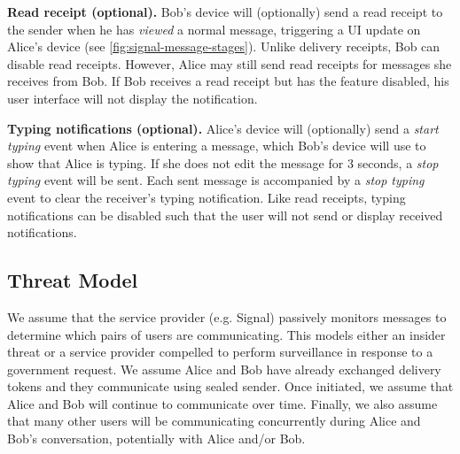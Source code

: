 \medskip \noindent
\textbf{Read receipt (optional).} 
Bob's device will (optionally) send a read receipt to the sender when he has \emph{viewed} a normal
message, triggering a UI update on Alice's device 
(see \cref{fig:signal-message-stages}). Unlike delivery receipts, Bob can disable read receipts. However, Alice may still send read receipts for messages she receives
from Bob. If Bob receives a read receipt but has the feature disabled, his user
interface will not display the notification. %

\medskip \noindent
\textbf{Typing notifications (optional).}\label{sssec:signal-typingNotifications}
Alice's device will (optionally) send a \emph{start typing} event when Alice is entering a
message, which Bob's device will use to show that Alice is typing. If she does
not edit the message for 3 seconds, a \emph{stop typing} event will be sent.
Each sent message is accompanied by a \emph{stop typing} event to clear the
receiver's typing notification. Like read receipts, typing notifications can be
disabled such that the user will not send or display received notifications.



\subsection{Threat Model}
\label{sec:signal-threat}

We assume that the service provider (e.g. Signal) passively monitors messages
to determine which pairs of users are communicating.  This models either an insider threat or a service provider compelled to perform surveillance in response to a government request.
We assume Alice and Bob have already exchanged delivery tokens and they communicate using sealed sender. Once initiated, we
assume that Alice and Bob will continue to communicate over time.  Finally, we also assume that
many other users will be communicating concurrently during Alice and Bob's conversation,
potentially with Alice and/or Bob.  

